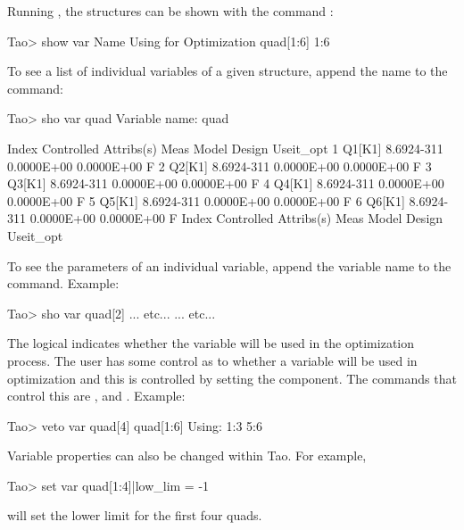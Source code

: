 \documentclass{hitec}     %
\begin{document}
{Running \tao, the  structures can be shown with the command : 
\begin{code}
Tao> show var
       Name                                      Using for Optimization
    quad[1:6]                                    1:6
\end{code}

To see a list of individual variables of a given  structure, append the 
name to the  command:
\begin{code}
Tao> sho var quad
Variable name:  quad

 Index  Controlled Attribs(s)    Meas         Model        Design  Useit_opt
     1  Q1[K1]               8.6924-311    0.0000E+00    0.0000E+00       F
     2  Q2[K1]               8.6924-311    0.0000E+00    0.0000E+00       F
     3  Q3[K1]               8.6924-311    0.0000E+00    0.0000E+00       F
     4  Q4[K1]               8.6924-311    0.0000E+00    0.0000E+00       F
     5  Q5[K1]               8.6924-311    0.0000E+00    0.0000E+00       F
     6  Q6[K1]               8.6924-311    0.0000E+00    0.0000E+00       F
 Index  Controlled Attribs(s)    Meas         Model        Design  Useit_opt
\end{code}

To see the parameters of an individual variable, append the variable name to the 
command. Example:
\begin{code}
Tao> sho var quad[2]
... etc...
... etc...
\end{code}
The  logical indicates whether the variable will be used in the optimization process.
The user has some control as to whether a variable will be used in optimization and this is controlled
by setting the  component. The commands that control this are ,  and
. Example:
\begin{code}
Tao> veto var quad[4]
  quad[1:6]                                      Using: 1:3 5:6
\end{code}

Variable properties can also be changed within Tao. For example, 
\begin{code}
Tao> set var quad[1:4]|low_lim = -1
\end{code}
will set the lower limit for the first four quads.

}
\end{document}
